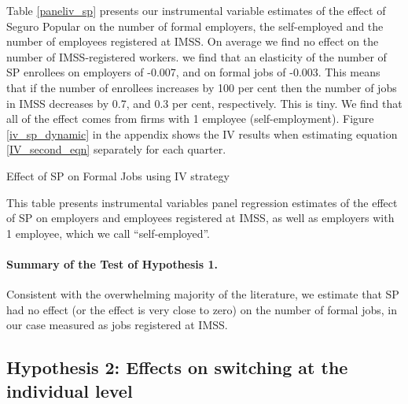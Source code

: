 \documentclass[oneside,11pt]{article}
\begin{document}
Table \ref{paneliv_sp} presents our instrumental variable estimates of the effect of Seguro Popular on the number of formal employers, the self-employed and the number of employees registered at IMSS. On average we find no effect on the number of IMSS-registered workers. we find that an elasticity of the number of SP enrollees on employers of -0.007, and on formal jobs of -0.003. This means that if the number of enrollees increases by 100 per cent then the number of jobs in IMSS decreases by 0.7, and 0.3 per cent, respectively. This is tiny. We find that all of the effect comes from firms with 1 employee (self-employment). Figure \ref{iv_sp_dynamic} in the appendix shows the IV results when estimating equation \ref{IV_second_eqn} separately for each quarter.


\vspace{.2in}
\begin{table}[H]
\caption{Effect of SP on Formal Jobs using IV strategy}
\label{paneliv_sp}
\begin{center}
\resizebox{0.55\textwidth}{!}{
\scriptsize{}
}
\end{center}
 \scriptsize 
 This table presents instrumental variables panel regression estimates of the effect of SP on employers and employees registered at IMSS, as well as employers with 1 employee, which we call ``self-employed''. 
\end{table}




\paragraph{Summary of the Test of Hypothesis 1.} Consistent with the overwhelming majority of the literature, we estimate that SP had no effect (or the effect is very close to zero) on the number of formal jobs, in our case measured as jobs registered at IMSS. 



\vspace{.2in}
\subsection{Hypothesis 2: Effects on switching at the individual level} \label{HTE}
\end{document}
